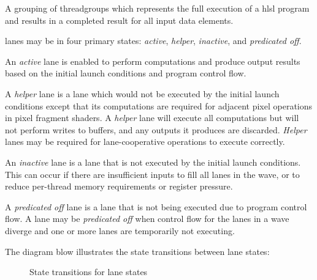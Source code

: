 
\p A grouping of \gls{threadgroup}s which represents the full execution of a
\acrshort{hlsl} program and results in a completed result for all input data
elements.


\p \gls{lane}s may be in four primary states: \textit{active}, \textit{helper},
\textit{inactive}, and \textit{predicated off}.

\p An \textit{active} \gls{lane} is enabled to perform computations and produce
output results based on the initial launch conditions and program control flow.

\p A \textit{helper} \gls{lane} is a lane which would not be executed by the
initial launch conditions except that its computations are required for adjacent
pixel operations in pixel fragment shaders. A \textit{helper} \gls{lane} will
execute all computations but will not perform writes to buffers, and any outputs
it produces are discarded. \textit{Helper} lanes may be required for
\gls{lane}-cooperative operations to execute correctly.

\p An \textit{inactive} \gls{lane} is a lane that is not executed by the initial
launch conditions. This can occur if there are insufficient inputs to fill all
\gls{lane}s in the \gls{wave}, or to reduce per-thread memory requirements or
register pressure.

\p A \textit{predicated off} \gls{lane} is a lane that is not being executed due
to program control flow. A \gls{lane} may be \textit{predicated off} when
control flow for the \gls{lane}s in a \gls{wave} diverge and one or more lanes
are temporarily not executing.

\p The diagram blow illustrates the state transitions between \gls{lane} states:

\begin{center}
\begin{figure}
  \centering
  \caption{State transitions for \gls{lane} states}
\end{figure}
\end{center}

